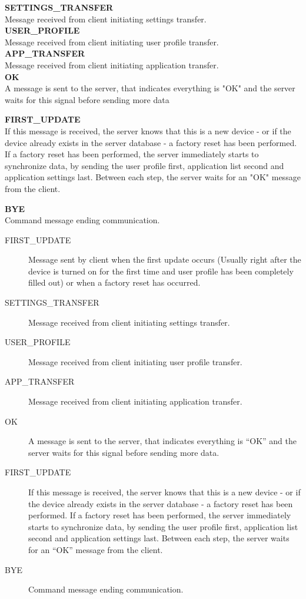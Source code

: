 \textbf{SETTINGS\_TRANSFER}\\
Message received from client initiating settings transfer. \\

\textbf{USER\_PROFILE}\\
Message received from client initiating user profile transfer. \\ 

\textbf{APP\_TRANSFER}\\
Message received from client initiating application transfer. \\

\textbf{OK}\\
A message is sent to the server, that indicates everything is "OK" and the server waits for this signal before sending more data

\textbf{FIRST\_UPDATE}\\
If this message is received, the server knows that this is a new device - or if the device already exists in the server database - a factory reset has been performed.
If a factory reset has been performed, the server immediately starts to synchronize data, by sending the user profile first, application list second and application settings last. Between each step, the server waits for an "OK" message from the client. 

\textbf{BYE}\\
Command message ending communication. 

\begin{description}
	\item[FIRST\_UPDATE] Message sent by client when the first update occurs (Usually right after the device is turned on for the first time and user profile has been completely filled out) or when a factory reset has occurred.
	\item[SETTINGS\_TRANSFER] Message received from client initiating settings transfer.
	\item[USER\_PROFILE] Message received from client initiating user profile transfer.
	\item[APP\_TRANSFER] Message received from client initiating application transfer.
	\item[OK] A message is sent to the server, that indicates everything is ``OK'' and the server waits for this signal before sending more data.
	\item[FIRST\_UPDATE] If this message is received, the server knows that this is a new device - or if the device already exists in the server database - a factory reset has been performed.
If a factory reset has been performed, the server immediately starts to synchronize data, by sending the user profile first, application list second and application settings last. Between each step, the server waits for an ``OK'' message from the client. 
	\item[BYE] Command message ending communication. 
\end{description}


